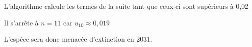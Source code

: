 \begin{enumerate}[resume]
\begin{enumerate}
%
L'algorithme calcule les termes de la suite tant que ceux-ci sont supérieurs à 0,02

Il s'arrête à $n = 11$ car $u_{10} \approx 0,019$

L'espèce sera donc menacée d'extinction en 2031.
	\end{enumerate}
\end{enumerate}


